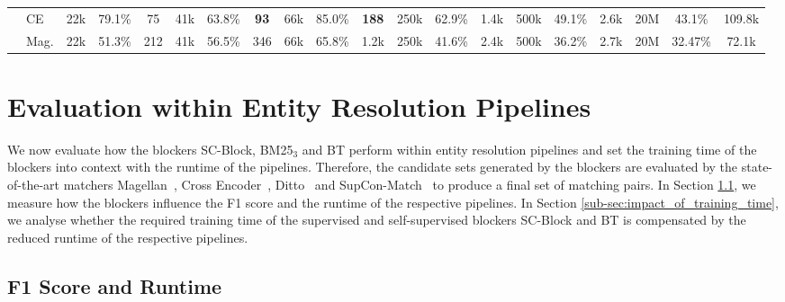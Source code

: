 \documentclass[sigconf,nonacm]{acmart}
\begin{document}
\begin{table*}[]
\begin{tabular}{@{}ll|ccc|ccc|ccc|ccc|ccc|ccc@{}}
         & CE       & 22k         & 79.1\%          & 75          & 41k          & 63.8\%          & \textbf{93} & 66k          & 85.0\%          & \textbf{188}             & 250k         & 62.9\%          & 1.4k                             & 500k          & 49.1\%          & 2.6k                             & 20M         & 43.1\%          & 109.8k         \\
         & Mag. & 22k         & 51.3\%          & 212         & 41k          & 56.5\%          & 346         & 66k          & 65.8\%          & 1.2k & 250k         & 41.6\%          & 2.4k                             & 500k          & 36.2\%          & 2.7k                             & 20M         & 32.47\%         & 72.1k              
\\ 
\bottomrule
\end{tabular}
\end{table*}

\section{Evaluation within Entity Resolution Pipelines}
\label{sec:evaluation_pipeline}
We now evaluate how the blockers SC-Block, BM25$_{3}$ and BT perform within entity resolution pipelines and set the training time of the blockers into context with the runtime of the pipelines.
Therefore, the candidate sets generated by the blockers are evaluated by the state-of-the-art matchers Magellan~\cite{konda_magellan_2016},  Cross Encoder~\cite{brunner_entity_2020}, Ditto~\cite{li_deep_2020} and SupCon-Match~\cite{peeters_supervised_2022} to produce a final set of matching pairs. 
In Section \ref{sub_sec:pip_eff_eff}, we measure how the blockers influence the F1 score and the runtime of the respective pipelines.
In Section \ref{sub-sec:impact_of_training_time}, we analyse whether the required training time of the supervised and self-supervised blockers SC-Block and BT is compensated by the reduced runtime of the respective pipelines.

















\subsection{F1 Score and Runtime}
\label{sub_sec:pip_eff_eff}
\end{document}
